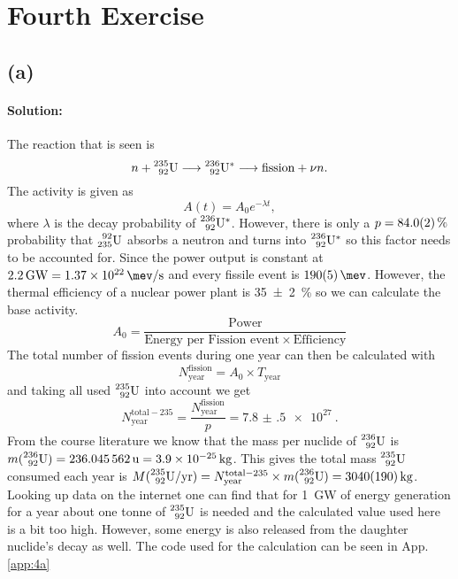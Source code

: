 \section{Fourth Exercise}
\subsection*{(a)} 

\paragraph{Solution:} The reaction that is seen is 
\begin{equation}
    n + \nuc{U}{235}{92} \longrightarrow \nuc{U}{236}{92}^* \longrightarrow \mathrm{fission} + \nu n.
\end{equation}
The activity is given as
\begin{equation}
    A(t) = A_0 e^{-\lambda t},
\end{equation}
where $\lambda$ is the decay probability of $\nuc{U}{236}{92}^*$. However, there is only a $ p = \SI{84.0 \pm 0.2}{\percent}$ probability that $\nuc{U}{92}{235}$ absorbs a neutron and turns into  $\nuc{U}{236}{92}^*$ so this factor needs to be accounted for. Since the power output is constant at $\SI{2.2}{\giga\watt} = \SI{1.37e22}{\mev\per\s}$ and every fissile event is $\SI{190 \pm 5}{\mev}$. However, the thermal efficiency of a nuclear power plant is \SI{35(2)}{\percent} so we can calculate the base activity.
\begin{equation}
    A_0 = \frac{\mathrm{Power}}{\text{Energy per Fission event}\times \mathrm{Efficiency}} 
\end{equation}
The total number of fission events during one year can then be calculated with
\begin{equation}
    N_\mathrm{year}^\mathrm{fission} = A_0 \times T_\mathrm{year}
\end{equation}
and taking all used $\nuc{U}{235}{92}$ into account we get 
\begin{equation}
	 N_\mathrm{year}^\mathrm{total-235} = \frac{N_\mathrm{year}^\mathrm{fission}}{p} = \SI{7.8(5)e27}{}.
\end{equation}
From the course literature we know that the mass per nuclide of $\nuc{U}{236}{92}$ is $m(\nuc{U}{236}{92}) = \SI{236.045562}{u} = \SI{3.9e-25}{\kilo\gram}$. This gives the total mass $\nuc{U}{235}{92}$ consumed each year is $M(\nuc{U}{235}{92} / \mathrm{yr}) = N_\mathrm{year}^\mathrm{total-235} \times m(\nuc{U}{236}{92}) = \SI{3040(190)}{\kg}$. Looking up data on the internet one can find that for \SI{1}{\giga\watt} of energy generation for a year about one tonne of $\nuc{U}{235}{92}$ is needed and the calculated value used here is a bit too high. However, some energy is also released from the daughter nuclide's decay as well. The code used for the calculation can be seen in App. \ref{app:4a}

